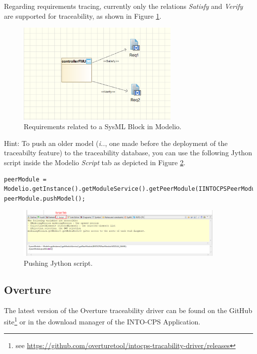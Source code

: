 Regarding requirements tracing, currently only the relations \textit{Satisfy} and \textit{Verify} are supported for traceability, as shown in Figure \ref{fig:modelio_trace_req}.
%
\begin{figure}[htbp]
\centering
\includegraphics[width=0.7\textwidth]{figures/modelio_trace_req}
\caption{Requirements related to a SysML Block in Modelio.}
\label{fig:modelio_trace_req}
\end{figure}
%
Hint: To push an older model (\emph{i.\@e.\@}, one made before the deployment of the traceabilty feature) to the traceability database, you can use the following Jython script inside the Modelio \emph{Script} tab as depicted in Figure \ref{fig:modelio_push_script}.
%
\begin{lstlisting}
peerModule = Modelio.getInstance().getModuleService().getPeerModule(IINTOCPSPeerModule.MODULE_NAME);
peerModule.pushModel();
\end{lstlisting}
%
\begin{figure}[htbp]
\centering
\includegraphics[width=0.9\textwidth]{figures/modelio/traceability_push_script}
\caption{Pushing Jython script.}
\label{fig:modelio_push_script}
\end{figure}
%
%
%
\subsection{Overture}
The latest version of the Overture traceability driver can be found on the GitHub site\footnote{see \url{https://github.com/overturetool/intocps-tracability-driver/releases}} or in the download manager of the INTO-CPS Application.

